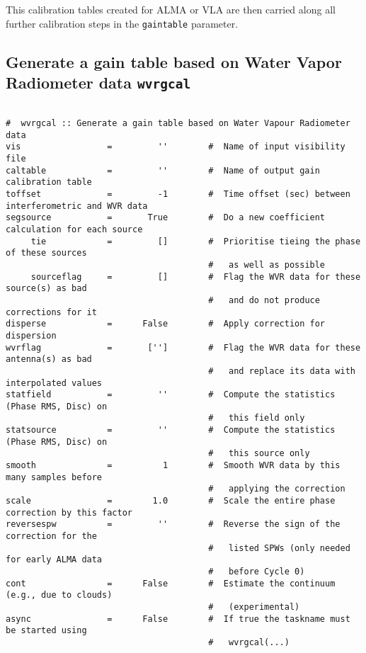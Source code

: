 This calibration tables created for ALMA or VLA are then carried
along all further calibration steps in the {\tt gaintable} parameter.

\subsection{ Generate a gain table based on Water Vapor Radiometer data {\tt wvrgcal}}
\label{section:cal.prior.wvrgcal}

\small
\begin{verbatim}

#  wvrgcal :: Generate a gain table based on Water Vapour Radiometer data
vis                 =         ''        #  Name of input visibility file
caltable            =         ''        #  Name of output gain calibration table
toffset             =         -1        #  Time offset (sec) between interferometric and WVR data
segsource           =       True        #  Do a new coefficient calculation for each source
     tie            =         []        #  Prioritise tieing the phase of these sources
                                        #   as well as possible 
     sourceflag     =         []        #  Flag the WVR data for these source(s) as bad
                                        #   and do not produce corrections for it
disperse            =      False        #  Apply correction for dispersion
wvrflag             =       ['']        #  Flag the WVR data for these antenna(s) as bad
                                        #   and replace its data with interpolated values
statfield           =         ''        #  Compute the statistics (Phase RMS, Disc) on
                                        #   this field only
statsource          =         ''        #  Compute the statistics (Phase RMS, Disc) on
                                        #   this source only
smooth              =          1        #  Smooth WVR data by this many samples before
                                        #   applying the correction
scale               =        1.0        #  Scale the entire phase correction by this factor
reversespw          =         ''        #  Reverse the sign of the correction for the
                                        #   listed SPWs (only needed for early ALMA data
                                        #   before Cycle 0)
cont                =      False        #  Estimate the continuum (e.g., due to clouds)
                                        #   (experimental)
async               =      False        #  If true the taskname must be started using
                                        #   wvrgcal(...)
\end{verbatim}
\normalsize

